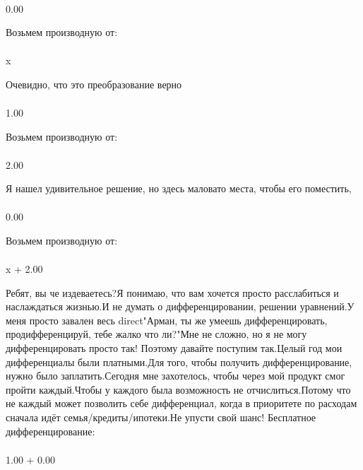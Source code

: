 \begin{gather}
\end{gather}
\begin{}
0.00 \\
\end{}
Возьмем производную от:
\begin{gather}
\end{gather}
\begin{}
x \\
\end{}
Очевидно, что это преобразование верно
\begin{gather}
\end{gather}
\begin{}
1.00 \\
\end{}
Возьмем производную от:
\begin{gather}
\end{gather}
\begin{}
2.00 \\
\end{}
Я нашел удивительное решение, но здесь маловато места, чтобы его поместить, 
\begin{gather}
\end{gather}
\begin{}
0.00 \\
\end{}
Возьмем производную от:
\begin{gather}
\end{gather}
\begin{}
x + 2.00 \\
\end{}
Ребят, вы че издеваетесь?Я понимаю, что вам хочется просто расслабиться и наслаждаться жизнью.И не думать о дифференцировании, решении уравнений.У меня просто завален весь direct"Арман, ты же умеешь дифференцировать, продифференцируй, тебе жалко что ли?"Мне не сложно, но я не могу дифференцировать просто так! Поэтому давайте поступим так.Целый год мои дифференциалы были платными.Для того, чтобы получить дифференцирование, нужно было заплатить.Сегодня мне захотелось, чтобы через мой продукт смог пройти каждый.Чтобы у каждого была возможность не отчислиться.Потому что не каждый может позволить себе дифференциал, когда в приоритете по расходам сначала идёт семья/кредиты/ипотеки.Не упусти свой шанс! Бесплатное дифференцирование: 
\begin{gather}
\end{gather}
\begin{}
1.00 + 0.00 \\
\end{}
